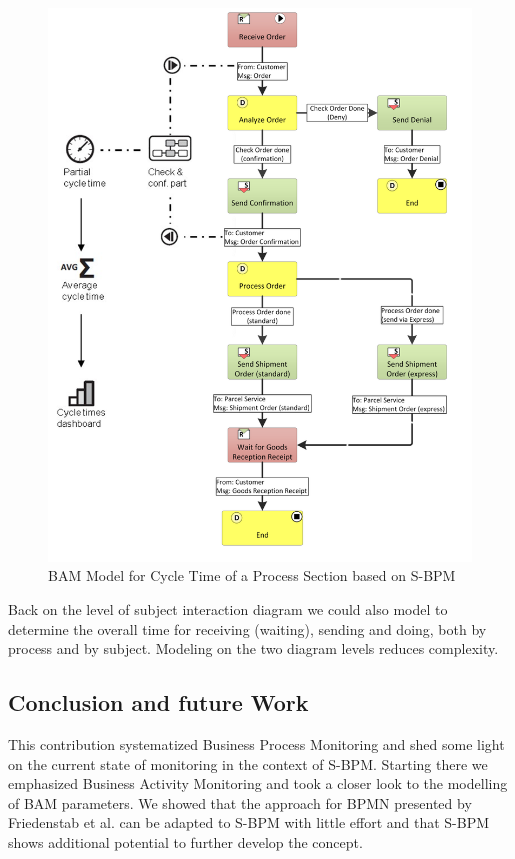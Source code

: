 \begin{figure}[htbp]
	\centering
	\includegraphics[width=0.9\linewidth]{Figures/Chapter5/Monitoring/BAM-Model-for-Cycle-Time-of-a-Process-Section-based-on-S-BPM_NEW.png}
	\caption[BAM Model for Cycle Time of a Process Section based on S-BPM]{BAM Model for Cycle Time of a Process Section based on S-BPM}
	\label{fig:BAM-Cycle-Time}
\end{figure}

Back on the level of subject interaction diagram we could also model to determine the overall time for receiving (waiting), sending and doing, both by process and by subject. Modeling on the two diagram levels reduces complexity.

\subsection {Conclusion and future Work}
This contribution systematized Business Process Monitoring and shed some light on the current state of monitoring in the context of S-BPM. Starting there we emphasized Business Activity Monitoring and took a closer look to the modelling of BAM parameters. We showed that the approach for BPMN presented by Friedenstab et al. can be adapted to S-BPM with little effort and that S-BPM shows additional potential to further develop the concept.
\\
